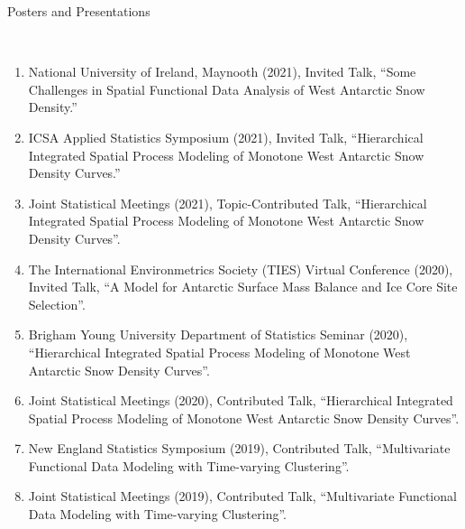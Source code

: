 \documentclass[11pt]{article}
\newcommand{\head}[1]{ %
    \bigskip %
    \begin{large}\begin{bf}{#1}\end{bf}\end{large} %

    \ \\ [-1.3cm] %

    \hrulefill}
\begin{document}
\head{Posters and Presentations}

\begin{enumerate}[label=$\bullet$]

\item National University of Ireland, Maynooth (2021), Invited Talk, ``Some Challenges in Spatial Functional Data Analysis of West Antarctic Snow Density.''
\item ICSA Applied Statistics Symposium (2021), Invited Talk, ``Hierarchical Integrated Spatial Process Modeling of Monotone West Antarctic Snow Density Curves.''
\item Joint Statistical Meetings (2021), Topic-Contributed Talk, ``Hierarchical Integrated Spatial Process Modeling of Monotone West Antarctic Snow Density Curves''.

\item The International Environmetrics Society (TIES) Virtual Conference (2020), Invited Talk, ``A Model for Antarctic Surface Mass Balance and Ice Core Site Selection''.
\item Brigham Young University Department of Statistics Seminar (2020), ``Hierarchical Integrated Spatial Process Modeling of Monotone West Antarctic Snow Density Curves''.
\item Joint Statistical Meetings (2020), Contributed Talk, ``Hierarchical Integrated Spatial Process Modeling of Monotone West Antarctic Snow Density Curves''.

\item New England Statistics Symposium (2019), Contributed Talk, ``Multivariate Functional Data Modeling with Time-varying Clustering''.
\item Joint Statistical Meetings (2019), Contributed Talk, ``Multivariate Functional Data Modeling with Time-varying Clustering''.


\end{enumerate}
\end{document}
